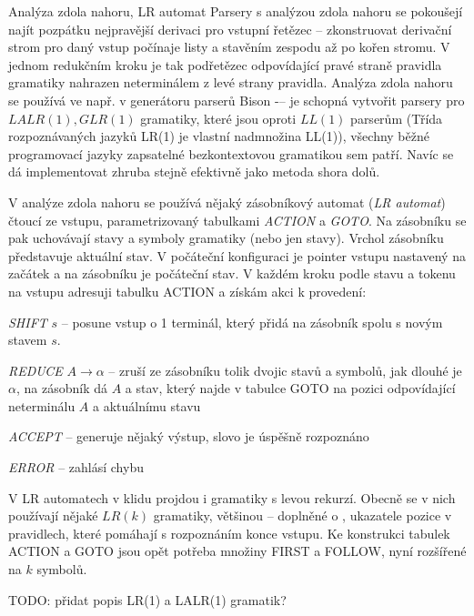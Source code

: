 \begin{definiceN}{Analýza zdola nahoru, LR automat}
Parsery s analýzou zdola nahoru se pokoušejí najít pozpátku nejpravější derivaci pro vstupní řetězec -- zkonstruovat derivační strom pro daný vstup počínaje listy a stavěním zespodu až po kořen stromu. V jednom redukčním kroku je tak podřetězec odpovídající pravé straně pravidla gramatiky nahrazen neterminálem z levé strany pravidla. Analýza zdola nahoru se používá ve např. v generátoru parserů Bison -– je schopná vytvořit parsery pro $LALR(1), GLR(1)$ gramatiky, které jsou oproti $LL(1)$ parserům  (Třída rozpoznávaných jazyků LR(1) je vlastní nadmnožina LL(1)), všechny běžné programovací jazyky zapsatelné bezkontextovou gramatikou sem patří. Navíc se dá implementovat zhruba stejně efektivně jako metoda shora dolů.

V analýze zdola nahoru se používá nějaký zásobníkový automat (\emph{LR automat}) čtoucí ze vstupu, parametrizovaný tabulkami \emph{ACTION} a \emph{GOTO}. Na zásobníku se pak uchovávají stavy a symboly gramatiky (nebo jen stavy). Vrchol zásobníku představuje aktuální stav. V počáteční konfiguraci je pointer vstupu nastavený na začátek a na zásobníku je počáteční stav. V každém kroku podle stavu a tokenu na vstupu adresuji tabulku ACTION a získám akci k provedení:
\begin{pitemize}
    \item \emph{SHIFT} $s$ -- posune vstup o 1 terminál, který přidá na zásobník spolu s novým stavem $s$.
    \item \emph{REDUCE} $A\to\alpha$ -- zruší ze zásobníku tolik dvojic stavů a symbolů, jak dlouhé je $\alpha$, na zásobník dá $A$ a stav, který najde v tabulce GOTO na pozici odpovídající neterminálu $A$ a aktuálnímu stavu
    \item \emph{ACCEPT} -- generuje nějaký výstup, slovo je úspěšně rozpoznáno
    \item \emph{ERROR} -- zahlásí chybu
\end{pitemize}
V LR automatech v klidu projdou i gramatiky s levou rekurzí. Obecně se v nich používají nějaké $LR(k)$ gramatiky, většinou  -- doplněné o , ukazatele pozice v pravidlech, které pomáhají s rozpoznáním konce vstupu. Ke konstrukci tabulek ACTION a GOTO jsou opět potřeba množiny FIRST a FOLLOW, nyní rozšířené na $k$ symbolů.
\end{definiceN}


TODO: přidat popis LR(1) a LALR(1) gramatik?
